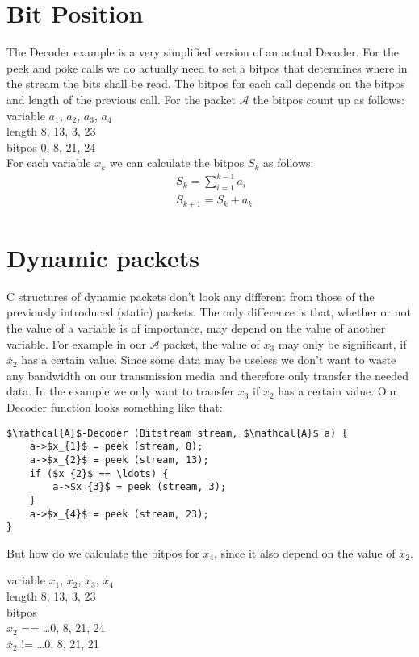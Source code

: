 \documentclass[paper=a4,DIV=12]{scrartcl}
\begin{document}
\section{Bit Position}

The Decoder example is a very simplified version of an actual Decoder.
For the peek and poke calls we do actually need to set a bitpos
that determines where in the stream the bits shall be read.
The bitpos for each call depends on the bitpos and length of the previous call.
For the packet $\mathcal{A}$ the bitpos count up as follows:\\
variable   $a_{1}$, $a_{2}$, $a_{3}$, $a_{4}$\\
length      8, 13,  3, 23\\
bitpos      0,  8, 21, 24\\
For each variable $x_{k}$ we can calculate the bitpos $S_{k}$ as follows:
\begin{align*}
	&S_{k} = \sum_{i=1}^{k-1} a_{i}\\
	&S_{k+1} = S_{k} + a_{k}
\end{align*}

\section{Dynamic packets}

C structures of dynamic packets don't look any different from those of the previously introduced (static) packets.
The only difference is that, whether or not the value of a variable is of importance, may depend on the value of another variable.	
For example in our $\mathcal{A}$ packet, the value of $x_{3}$ may only be significant, if $x_{2}$ has a certain value.
Since some data may be useless we don't want to waste any bandwidth on our transmission media and therefore only transfer the needed data.
In the example we only want to transfer $x_{3}$ if $x_{2}$ has a certain value.
Our Decoder function looks something like that:

\begin{lstlisting}[mathescape]
$\mathcal{A}$-Decoder (Bitstream stream, $\mathcal{A}$ a) {
	a->$x_{1}$ = peek (stream, 8);
	a->$x_{2}$ = peek (stream, 13);
	if ($x_{2}$ == \ldots) {
		a->$x_{3}$ = peek (stream, 3);
	}
	a->$x_{4}$ = peek (stream, 23);
}
\end{lstlisting}

But how do we calculate the bitpos for $x_{4}$, since it also depend on the value of $x_{2}$.

variable   $x_{1}$, $x_{2}$, $x_{3}$, $x_{4}$\\
length        8, 13, 3, 23\\
bitpos\\
$x_{2}$ == \ldots  0, 8, 21, 24\\
$x_{2}$ != \ldots  0, 8, 21, 21\\
\end{document}
